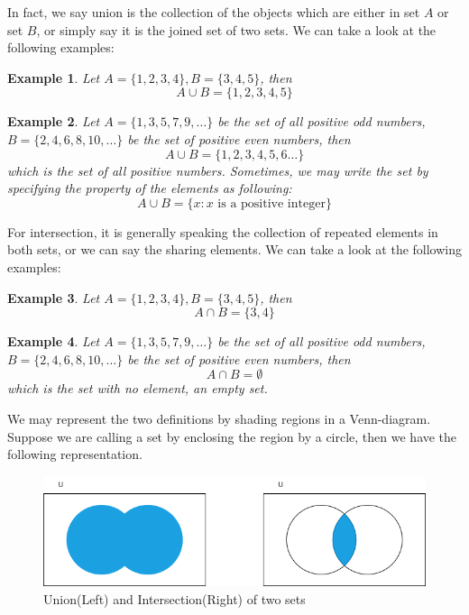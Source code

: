 \documentclass[12pt]{article}
\newtheorem*{example}{Example}
\begin{document}
    In fact, we say union is the collection of the objects which are either in set $A$ or set $B$, or simply say it is the joined set of two sets. We can take a look at the following examples:

    \begin{example}
        Let $A=\{1,2,3,4\}, B=\{3,4,5\}$, then $$A\cup B = \{1,2,3,4,5\}$$
    \end{example}

    \begin{example}
        Let $A=\{1,3,5,7,9,\dots\}$ be the set of all positive odd numbers, $B=\{2,4,6,8,10,\dots\}$ be the set of positive even numbers, then $$A\cup B = \{1,2,3,4,5,6\dots\}$$ which is the set of all positive numbers. Sometimes, we may write the set by specifying the property of the elements as following: $$A\cup B=\{x: x \textrm{ is a positive integer}\}$$
    \end{example}

    For intersection, it is generally speaking the collection of repeated elements in both sets, or we can say the sharing elements. We can take a look at the following examples:

    \begin{example}
        Let $A=\{1,2,3,4\}, B=\{3,4,5\}$, then $$A\cap B = \{3,4\}$$
    \end{example}

    \begin{example}
        Let $A=\{1,3,5,7,9,\dots\}$ be the set of all positive odd numbers, $B=\{2,4,6,8,10,\dots\}$ be the set of positive even numbers, then $$A\cap B = \emptyset$$ which is the set with no element, an empty set.
    \end{example}

    We may represent the two definitions by shading regions in a Venn-diagram. Suppose we are calling a set by enclosing the region by a circle, then we have the following representation.

    \begin{figure}[H]
        \centering
        \includegraphics[scale=0.6]{union and intersection.png}
        \caption{Union(Left) and Intersection(Right) of two sets}
    \end{figure}
\end{document}
